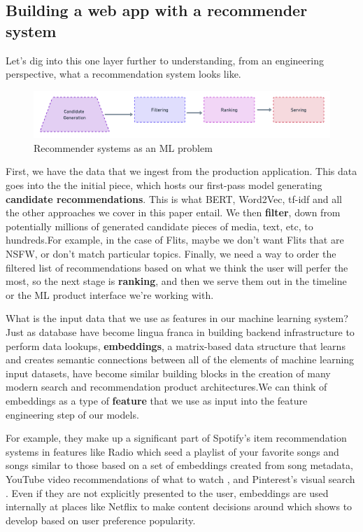 \documentclass[11pt]{diazessay} %
\begin{document}
\subsection{Building a web app with a recommender system}

Let's dig into this one layer further to understanding, from an engineering perspective, what a recommendation system looks like. 

\begin{figure}[!ht]
\centering
\includegraphics[width=\textwidth]{figures/recsys.png}
\caption{Recommender systems as an ML problem}
\end{figure}

First, we have the data that we ingest from the production application. This data goes into the the initial piece, which hosts our first-pass model generating \textbf{candidate recommendations}. This is what BERT, Word2Vec, tf-idf and all the other approaches we cover in this paper entail. We then \textbf{filter}, down from potentially millions of generated candidate pieces of media, text, etc, to hundreds.For example, in the case of Flits, maybe we don't want Flits that are NSFW, or don't match particular topics.  Finally, we need a way to order the filtered list of recommendations based on what we think the user will perfer the most, so the next stage is \textbf{ranking}, and then we serve them out in the timeline or the ML product interface we're working with. 

What is the input data that we use as features in our machine learning system? Just as database have become lingua franca in building backend infrastructure to perform data lookups, \textbf{embeddings}, a matrix-based data structure that learns and creates semantic connections between all of the elements of machine learning input datasets, have become similar building blocks in the creation of many modern search and recommendation product architectures.We can think of embeddings as a type of \textbf{feature} that we use as input into the feature engineering step of our models.  

For example, they make up a significant part of Spotify's item recommendation systems \citep{hansen2020contextual} in features like Radio which seed a playlist of your favorite songs and songs similar to those based on a set of embeddings created from song metadata, YouTube video recommendations of what to watch \citep{covington2016deep} , and Pinterest's visual search \citep{jing2015visual}. Even if they are not explicitly presented to the user, embeddings are used internally at places like Netflix to make content decisions around which shows to develop based on user preference popularity. 
\end{document}
